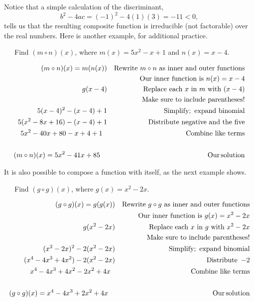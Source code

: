 Notice that a simple calculation of the discriminant, $$b^2-4ac=(-1)^2-4(1)(3)=-11<0,$$ tells us that the resulting composite function is irreducible (not factorable) over the real numbers.
\newpage
Here is another example, for additional practice.
\begin{example}~~~Find $(m\circ n)(x)$, where $m(x)=5x^2-x+1$ and $n(x)=x-4$.

  \begin{eqnarray*}
    (m \circ n) (x)=m(n (x)) &  & \text{Rewrite~} m\circ n \text{~as~inner~and~outer~functions}\\
	    &  & \text{Our~inner~function~is~} n(x) = x-4\\
    g (x-4) &  & \text{Replace~each~} x \text{~in~} m \text{~with~} (x-4)\\
		  &  & \text{Make~sure~to~include~parentheses!}\\
    5(x-4)^2 - (x-4)+1 &  & \operatorname{Simplify;~expand~binomial}\\
    5(x^2-8x+16) - (x-4)+1 &  & \operatorname{Distribute~negative~and~the~five}\\
    5x^2-40x+80 - x + 4+1~~ &  & \operatorname{Combine~like~terms}\\
    & & \\
		(m \circ n) (x)=5x^2-41x+85~~~ &  & \operatorname{Our} \operatorname{solution}\\
	\end{eqnarray*}
\end{example}


It is also possible to compose a function with itself, as the next example shows.
	
	\begin{example}~~~Find $(g\circ g)(x)$, where $g(x)=x^2-2x$.

  \begin{eqnarray*}
    (g \circ g) (x)=g (g (x)) &  & \text{Rewrite~} g\circ g \text{~as~inner~and~outer~functions}\\
	    &  & \text{Our~inner~function~is~} g(x) = x^2-2x\\
    g (x^2-2x) &  & \text{Replace~each~} x \text{~in~} g \text{~with~} x^2-2x\\
		  &  & \text{Make~sure~to~include~parentheses!}\\
    (x^2-2x)^2 - 2(x^2-2x) &  & \operatorname{Simplify;~expand~binomial}\\
    (x^4-4x^3+4x^2) - 2(x^2 -2x) &  & \operatorname{Distribute~}-2\\
    x^4-4x^3+4x^2 - 2x^2 + 4x~~ &  & \operatorname{Combine~like~terms}\\
    & & \\
		(g \circ g) (x)=x^4-4x^3+2x^2+4x~~~ &  & \operatorname{Our} \operatorname{solution}\\
	\end{eqnarray*}
\end{example}

